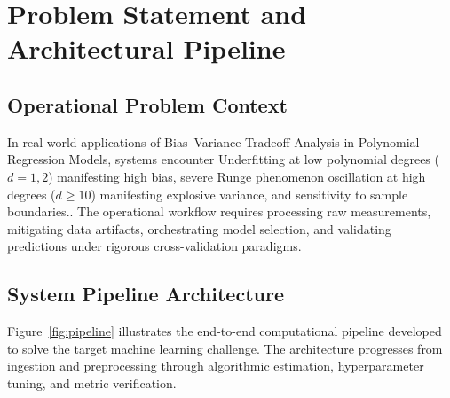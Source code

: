 \section{Problem Statement and Architectural Pipeline}

\subsection{Operational Problem Context}
In real-world applications of Bias--Variance Tradeoff Analysis in Polynomial Regression Models, systems encounter Underfitting at low polynomial degrees ($d=1, 2$) manifesting high bias, severe Runge phenomenon oscillation at high degrees ($d \ge 10$) manifesting explosive variance, and sensitivity to sample boundaries.. The operational workflow requires processing raw measurements, mitigating data artifacts, orchestrating model selection, and validating predictions under rigorous cross-validation paradigms.

\subsection{System Pipeline Architecture}
Figure~\ref{fig:pipeline} illustrates the end-to-end computational pipeline developed to solve the target machine learning challenge. The architecture progresses from ingestion and preprocessing through algorithmic estimation, hyperparameter tuning, and metric verification.

